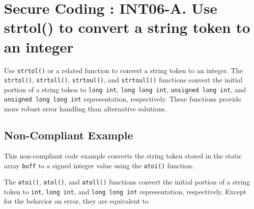 
   \section{Secure Coding : INT06-A. Use strtol() to convert a string token to an integer}

   Use {\tt strtol()} or a related function to convert a string token to an integer. The {\tt strtol()}, {\tt strtoll()}, {\tt strtoul()}, and {\tt strtoull()} functions convert the initial portion of a string token to {\tt long int}, {\tt long long int}, {\tt unsigned long int}, and {\tt unsigned long long int} representation, respectively. These functions provide more robust error handling than alternative solutions.
   \subsection{Non-Compliant Example}

   This non-compliant code example converts the string token stored in the static array {\tt buff} to a signed integer value using the {\tt atoi()} function.


   The {\tt atoi()}, {\tt atol()}, and {\tt atoll()} functions convert the initial portion of a string token to {\tt int}, {\tt long int}, and {\tt long long int} representation, respectively. Except for the behavior on error, they are equivalent to


